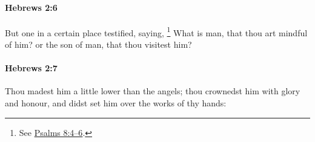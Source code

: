 		\paragraph{Hebrews 2:6} %
			\label{HEBREWS-2-6}

			But one in a certain place testified, saying,
				\footnote{%
					See \hyperref[PSALMS-8-4]{Psalms 8:4--6}.
					}%
			What is man, that thou art mindful of him? or the son of man, that thou visitest him?

			\begin{framed}
			\scriptsize
				\begin{compactdesc}
					\item[SBLG] 
				\end{compactdesc}
			\end{framed}

		\paragraph{Hebrews 2:7} %
			\label{HEBREWS-2-7}

			Thou madest him a little lower than the angels; thou crownedst him with glory and honour, and didst set him over the works of thy hands:

